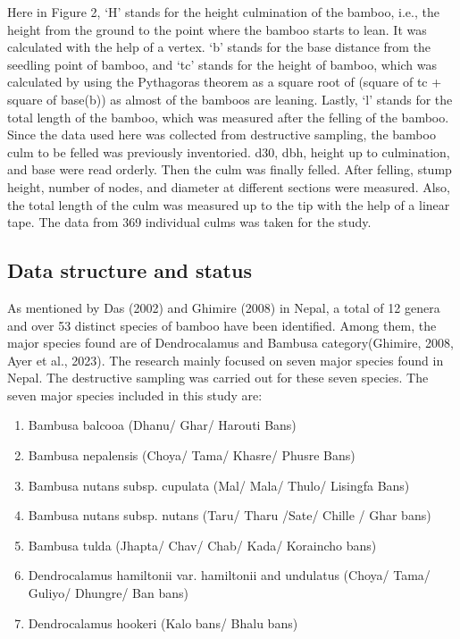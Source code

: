 \documentclass[preprint, 3p,
authoryear]{elsarticle} %
\begin{document}
Here in Figure 2, `H' stands for the height culmination of the bamboo,
i.e., the height from the ground to the point where the bamboo starts to
lean. It was calculated with the help of a vertex. `b' stands for the
base distance from the seedling point of bamboo, and `tc' stands for the
height of bamboo, which was calculated by using the Pythagoras theorem
as a square root of (square of tc + square of base(b)) as almost of the
bamboos are leaning. Lastly, `l' stands for the total length of the
bamboo, which was measured after the felling of the bamboo. Since the
data used here was collected from destructive sampling, the bamboo culm
to be felled was previously inventoried. d30, dbh, height up to
culmination, and base were read orderly. Then the culm was finally
felled. After felling, stump height, number of nodes, and diameter at
different sections were measured. Also, the total length of the culm was
measured up to the tip with the help of a linear tape. The data from 369
individual culms was taken for the study.

\hypertarget{data-structure-and-status}{%
\subsection{Data structure and status}\label{data-structure-and-status}}

As mentioned by Das (2002) and Ghimire (2008) in Nepal, a total of 12
genera and over 53 distinct species of bamboo have been identified.
Among them, the major species found are of Dendrocalamus and Bambusa
category(Ghimire, 2008, Ayer et al., 2023). The research mainly focused
on seven major species found in Nepal. The destructive sampling was
carried out for these seven species. The seven major species included in
this study are:

\begin{enumerate}
\def\labelenumi{\alph{enumi})}
\item
  Bambusa balcooa (Dhanu/ Ghar/ Harouti Bans)
\item
  Bambusa nepalensis (Choya/ Tama/ Khasre/ Phusre Bans)
\item
  Bambusa nutans subsp. cupulata (Mal/ Mala/ Thulo/ Lisingfa Bans)
\item
  Bambusa nutans subsp. nutans (Taru/ Tharu /Sate/ Chille / Ghar bans)
\item
  Bambusa tulda (Jhapta/ Chav/ Chab/ Kada/ Koraincho bans)
\item
  Dendrocalamus hamiltonii var. hamiltonii and undulatus (Choya/ Tama/
  Guliyo/ Dhungre/ Ban bans)
\item
  Dendrocalamus hookeri (Kalo bans/ Bhalu bans)
\end{enumerate}
\end{document}
